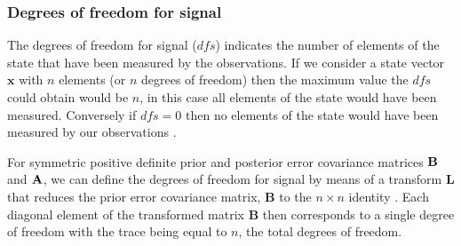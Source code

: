 \documentclass[11pt]{article}
\begin{document}
\subsubsection{Degrees of freedom for signal} \label{DFSintro}%

The degrees of freedom for signal ($dfs$) indicates the number of elements of the state that have been measured by the observations. If we consider a state vector $\textbf{x}$ with $n$ elements (or $n$ degrees of freedom) then the maximum value the $dfs$ could obtain would be $n$, in this case all elements of the state would have been measured. Conversely if $dfs = 0$ then no elements of the state would have been measured by our observations \citep{Fowler2013}.

For symmetric positive definite prior and posterior error covariance matrices $\bf{B}$ and $\bf{A}$, we can define the degrees of freedom for signal by means of a transform $\textbf{L}$ that reduces the prior error covariance matrix, $\textbf{B}$ to the $n \times n$ identity \citep{fisher2003estimation}. Each diagonal element of the transformed matrix $\textbf{B}$ then corresponds to a single degree of freedom with the trace being equal to $n$, the total degrees of freedom. 
\end{document}
